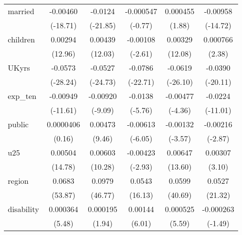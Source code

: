 {\begin{longtable}{l*{5}{c}}
married     &    -0.00460\sym{***}&     -0.0124\sym{***}&   -0.000547         &    0.000455         &    -0.00958\sym{***}\\
            &    (-18.71)         &    (-21.85)         &     (-0.77)         &      (1.88)         &    (-14.72)         \\
children    &     0.00294\sym{***}&     0.00439\sym{***}&    -0.00108\sym{**} &     0.00329\sym{***}&    0.000766\sym{*}  \\
            &     (12.96)         &     (12.03)         &     (-2.61)         &     (12.08)         &      (2.38)         \\
UKyrs       &     -0.0573\sym{***}&     -0.0527\sym{***}&     -0.0786\sym{***}&     -0.0619\sym{***}&     -0.0390\sym{***}\\
            &    (-28.24)         &    (-24.73)         &    (-22.71)         &    (-26.10)         &    (-20.11)         \\
exp\_ten     &    -0.00949\sym{***}&    -0.00920\sym{***}&     -0.0138\sym{***}&    -0.00477\sym{***}&     -0.0224\sym{***}\\
            &    (-11.61)         &     (-9.09)         &     (-5.76)         &     (-4.36)         &    (-11.01)         \\
public      &   0.0000406         &     0.00473\sym{***}&    -0.00613\sym{***}&    -0.00132\sym{***}&    -0.00216\sym{**} \\
            &      (0.16)         &      (9.46)         &     (-6.05)         &     (-3.57)         &     (-2.87)         \\
u25         &     0.00504\sym{***}&     0.00603\sym{***}&    -0.00423\sym{**} &     0.00647\sym{***}&     0.00307\sym{**} \\
            &     (14.78)         &     (10.28)         &     (-2.93)         &     (13.60)         &      (3.10)         \\
region      &      0.0683\sym{***}&      0.0979\sym{***}&      0.0543\sym{***}&      0.0599\sym{***}&      0.0527\sym{***}\\
            &     (53.87)         &     (46.77)         &     (16.13)         &     (40.69)         &     (21.32)         \\
disability  &    0.000364\sym{***}&    0.000195         &     0.00144\sym{***}&    0.000525\sym{***}&   -0.000263         \\
            &      (5.48)         &      (1.94)         &      (6.01)         &      (5.59)         &     (-1.49)         \\

\end{longtable}}
